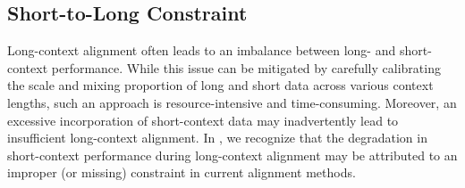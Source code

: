 


\subsection{Short-to-Long Constraint}
\label{subsec:short_to_long_kl}
Long-context alignment often leads to an imbalance between long- and short-context performance. While this issue can be mitigated by carefully calibrating the scale and mixing proportion of long and short data across various context lengths, such an approach is resource-intensive and time-consuming. Moreover, an excessive incorporation of short-context data may inadvertently lead to insufficient long-context alignment. In \ourMethod{}, we recognize that the degradation in short-context performance during long-context alignment may be attributed to an improper (or missing) constraint in current alignment methods.

